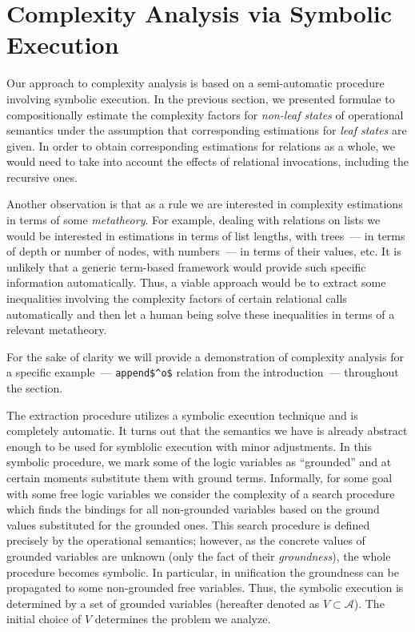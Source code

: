 \section{Complexity Analysis via Symbolic Execution}
\label{sec:symbolic}

Our approach to complexity analysis is based on a semi-automatic procedure involving symbolic execution.
In the previous section, we presented formulae to compositionally estimate the complexity factors for
\emph{non-leaf states} of operational semantics under the assumption that corresponding estimations for
\emph{leaf states} are given. In order to obtain corresponding estimations for relations as a whole, we
would need to take into account the effects of relational invocations, including the recursive ones.

Another observation is that as a rule we are interested in complexity estimations in terms of some \emph{metatheory}. For
example, dealing with relations on lists we would be interested in estimations in terms of list lengths,
with trees~--- in terms of depth or number of nodes, with numbers~--- in terms of their values, etc. It is
unlikely that a generic term-based framework would provide such specific information automatically. Thus,
a viable approach would be to extract some inequalities involving the complexity factors of certain relational
calls automatically and then let a human being solve these inequalities in terms of a relevant metatheory.

For the sake of clarity we will provide a demonstration of complexity analysis for a specific example~---
\lstinline|append$^o$| relation from the introduction~--- throughout the section.

The extraction procedure utilizes a symbolic execution technique and is completely automatic.
It turns out that the semantics we have is already abstract enough to be used for symblolic
execution with minor adjustments.
In this symbolic procedure, we mark some of the logic variables as ``grounded'' and at certain
moments substitute them with ground terms.
Informally, for some goal with some free logic variables we consider the complexity of a search
procedure which finds the bindings for all non-grounded variables based on the ground values
substituted for the grounded ones.
This search procedure is defined precisely by the operational semantics; however, as the concrete
values of grounded variables are unknown (only the fact of their \emph{groundness}), the whole
procedure becomes symbolic.
In particular, in unification the groundness can be propagated to some non-grounded free variables.
Thus, the symbolic execution is determined by a set of grounded variables (hereafter denoted
as $V\subset\mathcal A$). The initial choice of $V$ determines the problem we analyze.

